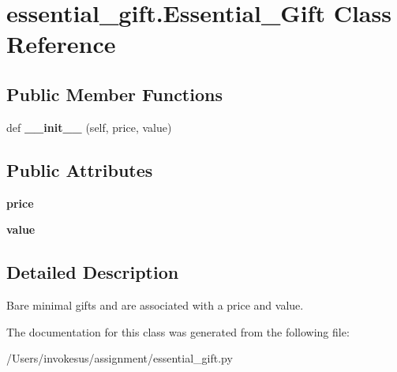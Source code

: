 \hypertarget{classessential__gift_1_1_essential___gift}{}\section{essential\+\_\+gift.\+Essential\+\_\+\+Gift Class Reference}
\label{classessential__gift_1_1_essential___gift}
\subsection*{Public Member Functions}
\begin{DoxyCompactItemize}
\item 
\mbox{\label{classessential__gift_1_1_essential___gift_a3425b38913d6abbb0d2976ea3339aadd}} 
def {\bfseries \+\_\+\+\_\+init\+\_\+\+\_\+} (self, price, value)
\end{DoxyCompactItemize}
\subsection*{Public Attributes}
\begin{DoxyCompactItemize}
\item 
\mbox{\label{classessential__gift_1_1_essential___gift_aa0895da6a47b0591270e45f564f31fe4}} 
{\bfseries price}
\item 
\mbox{\label{classessential__gift_1_1_essential___gift_a0efdc8693deea51040a398e296bfece7}} 
{\bfseries value}
\end{DoxyCompactItemize}


\subsection{Detailed Description}
\begin{DoxyVerb}Bare minimal gifts and are associated with a price and value.
\end{DoxyVerb}
 

The documentation for this class was generated from the following file\+:\begin{DoxyCompactItemize}
\item 
/\+Users/invokesus/assignment/essential\+\_\+gift.\+py\end{DoxyCompactItemize}
